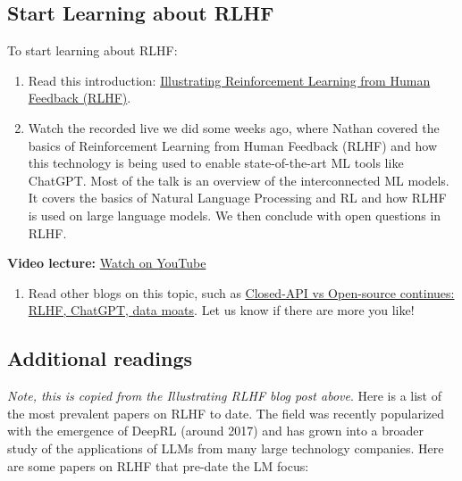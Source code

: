 \documentclass[11pt,a4paper]{article}
\begin{document}
\subsection{Start Learning about RLHF}\label{start-learning-about-rlhf}

To start learning about RLHF:

\begin{enumerate}
\def\labelenumi{\arabic{enumi}.}
\item
  Read this introduction: \href{https://huggingface.co/blog/rlhf}{Illustrating Reinforcement Learning from Human Feedback (RLHF)}.
\item
  Watch the recorded live we did some weeks ago, where Nathan covered the basics of Reinforcement Learning from Human Feedback (RLHF) and how this technology is being used to enable state-of-the-art ML tools like ChatGPT. Most of the talk is an overview of the interconnected ML models. It covers the basics of Natural Language Processing and RL and how RLHF is used on large language models. We then conclude with open questions in RLHF.
\end{enumerate}

\textbf{Video lecture:} \href{https://www.youtube.com/watch?v=2MBJOuVq380}{Watch on YouTube}

\begin{enumerate}
\def\labelenumi{\arabic{enumi}.}
\setcounter{enumi}{2}
\tightlist
\item
  Read other blogs on this topic, such as \href{https://robotic.substack.com/p/rlhf-chatgpt-data-moats}{Closed-API vs Open-source continues: RLHF, ChatGPT, data moats}. Let us know if there are more you like!
\end{enumerate}

\subsection{Additional readings}\label{additional-readings}

\emph{Note, this is copied from the Illustrating RLHF blog post above}. Here is a list of the most prevalent papers on RLHF to date. The field was recently popularized with the emergence of DeepRL (around 2017) and has grown into a broader study of the applications of LLMs from many large technology companies. Here are some papers on RLHF that pre-date the LM focus:
\end{document}
